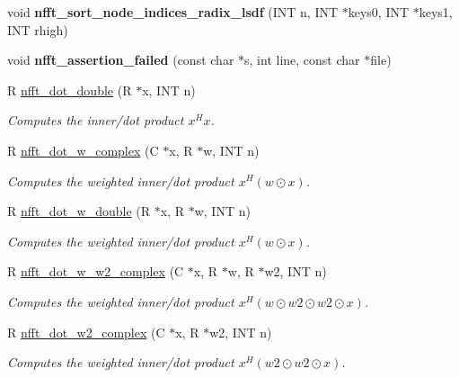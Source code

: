 \begin{DoxyCompactItemize}
\item 
\hypertarget{group__nfftutil_ga216ecc3b92623559712dc43ff4e20c50}{void {\bfseries nfft\-\_\-sort\-\_\-node\-\_\-indices\-\_\-radix\-\_\-lsdf} (I\-N\-T n, I\-N\-T $\ast$keys0, I\-N\-T $\ast$keys1, I\-N\-T rhigh)}\label{group__nfftutil_ga216ecc3b92623559712dc43ff4e20c50}

\item 
\hypertarget{group__nfftutil_ga4b6ec9a276de323bfbd84df3b24225d6}{void {\bfseries nfft\-\_\-assertion\-\_\-failed} (const char $\ast$s, int line, const char $\ast$file)}\label{group__nfftutil_ga4b6ec9a276de323bfbd84df3b24225d6}

\item 
R \hyperlink{group__nfftutil_ga3a8e45549ed46ebbac636756becdc927}{nfft\-\_\-dot\-\_\-double} (R $\ast$x, I\-N\-T n)
\begin{DoxyCompactList}\small\item\em Computes the inner/dot product $x^H x$. \end{DoxyCompactList}\item 
R \hyperlink{group__nfftutil_ga77cbe24e3bd4f770ef8161c3570dbfe2}{nfft\-\_\-dot\-\_\-w\-\_\-complex} (C $\ast$x, R $\ast$w, I\-N\-T n)
\begin{DoxyCompactList}\small\item\em Computes the weighted inner/dot product $x^H (w \odot x)$. \end{DoxyCompactList}\item 
R \hyperlink{group__nfftutil_ga6f531fc19029c1ac2bdc4310f3556e83}{nfft\-\_\-dot\-\_\-w\-\_\-double} (R $\ast$x, R $\ast$w, I\-N\-T n)
\begin{DoxyCompactList}\small\item\em Computes the weighted inner/dot product $x^H (w \odot x)$. \end{DoxyCompactList}\item 
R \hyperlink{group__nfftutil_gabd3c4af5172820c11e647dff955f8ff6}{nfft\-\_\-dot\-\_\-w\-\_\-w2\-\_\-complex} (C $\ast$x, R $\ast$w, R $\ast$w2, I\-N\-T n)
\begin{DoxyCompactList}\small\item\em Computes the weighted inner/dot product $x^H (w\odot w2\odot w2 \odot x)$. \end{DoxyCompactList}\item 
R \hyperlink{group__nfftutil_gaa4fa87321bb4eb9b3a9958bee41af236}{nfft\-\_\-dot\-\_\-w2\-\_\-complex} (C $\ast$x, R $\ast$w2, I\-N\-T n)
\begin{DoxyCompactList}\small\item\em Computes the weighted inner/dot product $x^H (w2\odot w2 \odot x)$. \end{DoxyCompactList}\item 

\end{DoxyCompactItemize}
